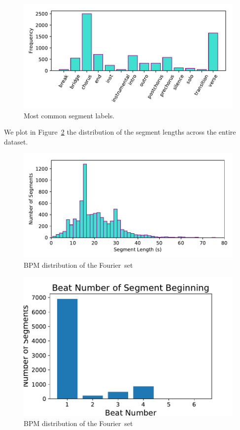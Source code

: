 \documentclass{article}
\newcommand{\setName}{Fourier}
\begin{document}
\begin{figure}
    \centerline{\includegraphics[width=\columnwidth]{figs/SegmentLabels_distribution.pdf}}
    \caption{Most common segment labels.}
    \label{fig:seglabel_dist}
\end{figure}

We plot in Figure~\ref{fig:seglen_dist} the distribution of the segment lengths across the entire dataset.

\begin{figure}
    \centerline{\includegraphics[width=\columnwidth]{figs/SegmentLength_distribution.pdf}}
    \caption{BPM distribution of the \setName~set}
    \label{fig:seglen_dist}
\end{figure}

\begin{figure}
    \centerline{\includegraphics[width=\columnwidth]{figs/Downbeat_Segment_Alignment.pdf}}
    \caption{BPM distribution of the \setName~set}
    \label{fig:downbeat_segment}
\end{figure}
\end{document}
